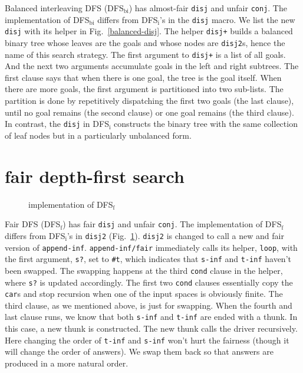 \documentclass[format=acmlarge, review=true, authordraft=true]{acmart}
\newcommand{\conj}{\texttt{conj}}
\newcommand{\disj}{\texttt{disj}}
\newcommand{\DFSi }[0]{DFS$_\textrm{i}$}
\newcommand{\DFSf }[0]{DFS$_\textrm{f}$}
\begin{document}
Balanced interleaving DFS (DFS$_\textrm{bi}$) has almost-fair \disj{} and unfair 
\conj{}. The implementation of DFS$_\textrm{bi}$ differs from 
DFS$_\textrm{i}$'s 
in the \disj{} macro. We list the new \disj{} with its helper in 
Fig.~\ref{balanced-disj}. The helper \texttt{disj+} builds a balanced binary 
tree 
whose leaves are the goals and whose nodes are \texttt{disj2}s, hence the name 
of 
this search strategy. The first argument 
to \texttt{disj+} is a list of all goals. And the next two arguments accumulate 
goals in 
the left and right subtrees. The first clause says that when there is one goal, 
the tree is the goal itself. When there are more goals, the first argument is 
partitioned into two sub-lists. The partition is done by repetitively 
dispatching the first two goals (the last clause), until no goal remains (the 
second clause) or one goal remains (the third clause). In contrast, the \disj{} 
in DFS$_\textrm{i}$ constructs the binary tree with the same collection of leaf 
nodes but in a particularly unbalanced form.



\section{fair depth-first search}

\begin{figure}
	
	\caption{implementation of \DFSf{}}
	\label{fDFS}
\end{figure}

Fair DFS (\DFSf) has fair \disj{} and unfair \conj{}. The 
implementation of \DFSf{} differs from \DFSi{}'s in 
\texttt{disj2} (Fig.~\ref{fDFS}). \texttt{disj2} is changed to call a new and 
fair version of \texttt{append-inf}. \texttt{append-inf/fair} immediately calls 
its helper, \texttt{loop}, with the first argument, \texttt{s?}, set to 
\texttt{\#{}t}, which indicates that 
\texttt{s-inf} and \texttt{t-inf} haven't been swapped. The swapping happens at 
the third \texttt{cond} clause in the helper, where \texttt{s?} is updated 
accordingly. The first two \texttt{cond} clauses essentially copy the 
\texttt{car}s and stop recursion when one of the input spaces is obviously 
finite. The third clause, as we mentioned above, is just for swapping. When the 
fourth and last clause runs, we know that both \texttt{s-inf} and \texttt{t-inf} 
are ended with a thunk. In this case, a new thunk is constructed. The new thunk 
calls the driver recursively. Here changing the order of \texttt{t-inf} and 
\texttt{s-inf} won't hurt the fairness (though it will change the order of 
answers). We swap them back so that answers are produced in a more natural 
order.
\end{document}

